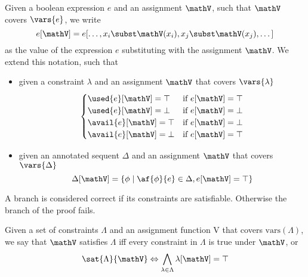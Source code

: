 \begin{define}[Evaluation]
	\label{def:evaluation}
	Given a boolean expression $e$ and an assignment $\mathV$, such that $\mathV$ covers $\vars{e}$, we write
		$$ e[\mathV] = e[\dots, x_i \subst \mathV(x_i), x_j \subst \mathV(x_j), \dots] $$
	as the value of the expression $e$ substituting with the assignment $\mathV$.
	We extend this notation, such that
	\begin{itemize}
		\item given a constraint $\lambda$ and an assignment $\mathV$ that covers $\vars{\lambda}$
			$$ 
			\begin{cases} 
				\used{e}[\mathV] = \top & \text{if } e[\mathV] = \top \\
				\used{e}[\mathV] = \bot & \text{if } e[\mathV] = \bot \\
				\avail{e}[\mathV] = \top & \text{if } e[\mathV] = \bot \\
				\avail{e}[\mathV] = \bot & \text{if } e[\mathV] = \top \\
			\end{cases}
			$$
		\item given an annotated sequent $\Delta$ and an assignment $\mathV$ that covers $\vars{\Delta}$
			$$ \Delta[\mathV] = \{ \phi \mid \af{\phi}{e} \in \Delta , e[\mathV] = \top \} $$
	\end{itemize}
\end{define}
A branch is considered correct if its constraints are satisfiable.
Otherwise the branch of the proof fails.
\begin{define}
	\label{def:sat}
	Given a set of constraints $\Lambda$ and an assignment function V that covers $\mathrm{vars}(\Lambda)$, we say that $\mathV$ satisfies $\Lambda$ iff every constraint in $\Lambda$ is true under $\mathV$, or
	$$ \sat{\Lambda}{\mathV} \Leftrightarrow \bigwedge_{\lambda \in \Lambda} \lambda[\mathV] = \top $$
\end{define}


